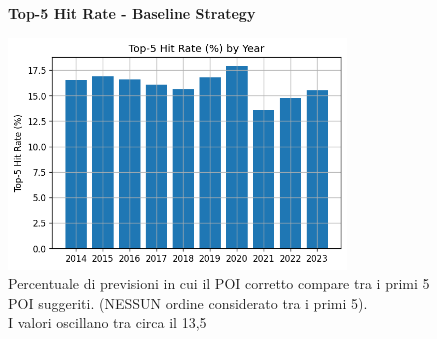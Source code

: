 \documentclass[12pt,a4paper]{article}
\begin{document}
\begin{enumerate}
\begin{figure}[H]
\centering
\textbf{Top-5 Hit Rate - Baseline Strategy}\par
\vspace{0.5em}
\includegraphics[width=0.8\textwidth]{../../img/no_SPACE-GEO_n-1_come_current_POI/top5_hit_rate.png}
\caption{Percentuale di previsioni in cui il POI corretto compare tra i primi 5 POI suggeriti. (NESSUN ordine considerato tra i primi 5).\\ I valori oscillano tra circa il 13,5%
}
\label{fig:baseline_top5}
\end{figure}


\end{enumerate}
\end{document}
